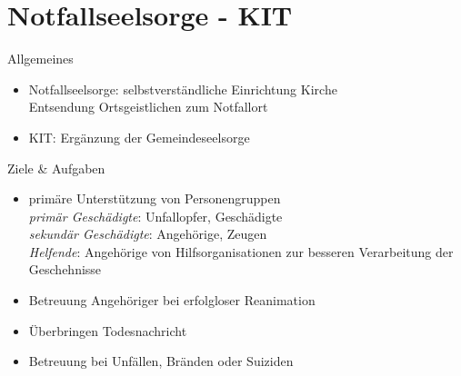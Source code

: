 \section{Notfallseelsorge - KIT}
\begin{sectionbox}{Allgemeines}
    \begin{itemize}
        \item Notfallseelsorge: selbstverständliche Einrichtung Kirche\\
        \ra Entsendung Ortsgeistlichen zum Notfallort
        \item KIT: Ergänzung der Gemeindeseelsorge
    \end{itemize}
\end{sectionbox}
\begin{sectionbox}{Ziele \& Aufgaben}
    \begin{itemize}
        \item primäre Unterstützung von Personengruppen\\
        \ra \emph{primär Geschädigte}: Unfallopfer, Geschädigte\\
        \ra \emph{sekundär Geschädigte}: Angehörige, Zeugen\\
        \ra \emph{Helfende}: Angehörige von Hilfsorganisationen zur besseren Verarbeitung der Geschehnisse
        \item Betreuung Angehöriger bei erfolgloser Reanimation
        \item Überbringen Todesnachricht
        \item Betreuung bei Unfällen, Bränden oder Suiziden
    \end{itemize}
\end{sectionbox}